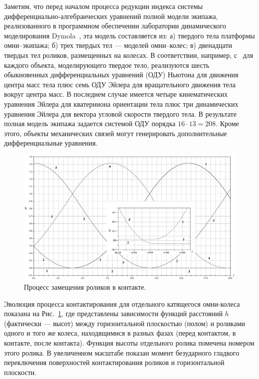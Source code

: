 Заметим, что перед началом процесса редукции индекса системы 
дифференциально-алгебраических уравнений полной модели экипажа, реализованного
в программном обеспечении лаборатории динамического моделирования 
Dymola~\cite{Dymola}, эта модель составляется из: а) твердого тела платформы
омни--экипажа; б) трех твердых тел --- моделей омни--колес; в) двенадцати 
твердых тел роликов, размещенных на колесах. В соответствии, например, 
с~\cite{Kosenko2007} для каждого объекта, моделирующего твердое тело, 
реализуются шесть обыкновенных дифференциальных уравнений (ОДУ) Ньютона для
движения центра масс тела плюс семь ОДУ Эйлера для вращательного движения тела
вокруг центра масс. В последнем случае имеется четыре кинематических уравнения
Эйлера для кватерниона ориентации тела плюс три динамических уравнения Эйлера
для вектора угловой скорости твердого тела. В результате полная модель экипажа
задается системой ОДУ порядка $16\cdot 13=208$. Кроме этого, объекты 
механических связей могут генерировать дополнительные дифференциальные 
уравнения.

\begin{figure}[htb]
\centerline{\includegraphics[width=15cm]{content/parts/3_friction/nd/Figure11.eps}}
\caption{Процесс замещения роликов в контакте.}
\label{fig1}
\end{figure}

Эволюция процесса контактирования для отдельного катящегося омни-колеса 
показана на Рис.~\ref{fig1}, где представлены зависимости функций расстояний 
$h$ (фактически --- высот) между горизонтальной плоскостью (полом) и роликами 
одного и того же колеса, находящимися в разных фазах (перед контактом, в 
контакте, после контакта). Функция высоты отдельного ролика помечена номером 
этого ролика. В увеличенном масштабе показан момент безударного гладкого 
переключения поверхностей контактирования роликов и горизонтальной плоскости.

